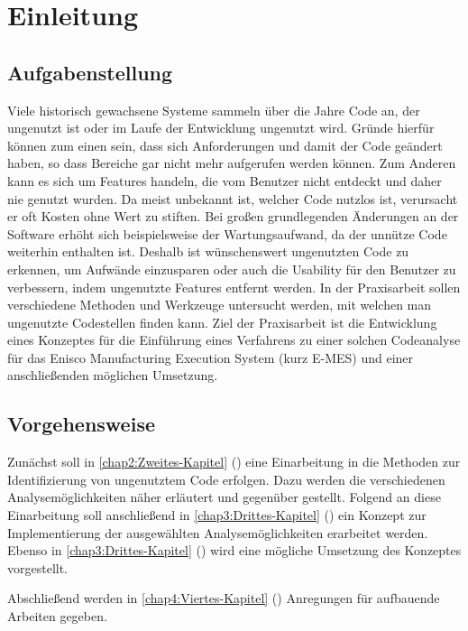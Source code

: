 \chapter{Einleitung\label{chap1:Erstes-Kapitel}}

\section{Aufgabenstellung\label{sec1.2:Unterpunkt-2}}

Viele historisch gewachsene Systeme sammeln über die Jahre Code an, der ungenutzt ist oder im Laufe der Entwicklung ungenutzt wird. Gründe hierfür können zum einen sein, dass sich Anforderungen und damit der Code geändert haben, so dass Bereiche gar nicht mehr aufgerufen werden können. Zum Anderen kann es sich um Features handeln, die vom Benutzer nicht entdeckt und daher nie genutzt wurden. Da meist unbekannt ist, welcher Code nutzlos ist, verursacht er oft Kosten ohne Wert zu stiften. Bei großen grundlegenden Änderungen an der Software erhöht sich beispielsweise der Wartungsaufwand, da der unnütze Code weiterhin enthalten ist. Deshalb ist wünschenswert ungenutzten Code zu erkennen, um Aufwände einzusparen oder auch die Usability für den Benutzer zu verbessern, indem ungenutzte Features entfernt werden. In der Praxisarbeit sollen verschiedene Methoden und Werkzeuge untersucht werden, mit welchen man ungenutzte Codestellen finden kann. Ziel der Praxisarbeit ist die Entwicklung eines Konzeptes für die Einführung eines Verfahrens zu einer solchen Codeanalyse für das Enisco Manufacturing Execution System (kurz E-MES) und einer anschließenden möglichen Umsetzung.

\section{Vorgehensweise\label{sec1.3:Unterpunkt-3}}

Zunächst soll in \autoref{chap2:Zweites-Kapitel} () eine Einarbeitung in die Methoden zur Identifizierung von ungenutztem Code erfolgen. Dazu werden die verschiedenen Analysemöglichkeiten näher erläutert und gegenüber gestellt. Folgend an diese Einarbeitung soll anschließend in \autoref{chap3:Drittes-Kapitel} () ein Konzept zur Implementierung der ausgewählten Analysemöglichkeiten erarbeitet werden. Ebenso in  \autoref{chap3:Drittes-Kapitel} () wird eine mögliche Umsetzung des Konzeptes vorgestellt.

Abschließend werden in \autoref{chap4:Viertes-Kapitel} () Anregungen für aufbauende Arbeiten gegeben.